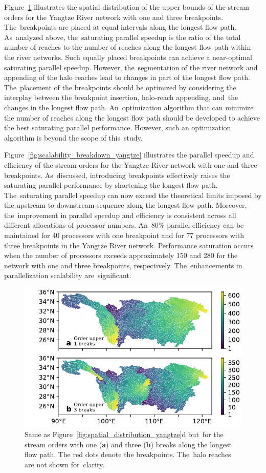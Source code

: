\documentclass[water,article,accept,pdftex,moreauthors]{Definitions/mdpi}
\begin{document}
Figure~\ref{fig:spatial_distribution_breakdown_yangtze} illustrates the spatial distribution of the upper bounds of the stream orders for the Yangtze River network with one and three breakpoints. The~breakpoints are placed at equal intervals along the longest flow path. As~analyzed above, the~saturating parallel speedup is the ratio of the total number of reaches to the number of reaches along the longest flow path within the river networks. Such equally placed breakpoints can achieve a near-optimal saturating parallel speedup. However, the~segmentation of the river network and appending of the halo reaches lead to changes in part of the longest flow path. The~placement of the breakpoints should be optimized by considering the interplay between the breakpoint insertion, halo-reach appending, and~the changes in the longest flow path. An~optimization algorithm that can minimize the number of reaches along the longest flow path should be developed to achieve the best saturating parallel performance. However, such an optimization algorithm is beyond the scope of this~study.

Figure~\ref{fig:scalability_breakdown_yangtze} illustrates the parallel speedup and efficiency of the stream orders for the Yangtze River network with one and three breakpoints. As~discussed, introducing breakpoints effectively raises the saturating parallel performance by shortening the longest flow path. The~saturating parallel speedup can now exceed the theoretical limits imposed by the upstream-to-downstream sequence along the longest flow path. Moreover, the~improvement in parallel speedup and efficiency is consistent across all different allocations of processor numbers. An~80\% parallel efficiency can be maintained for 40 processors with one breakpoint and for 77 processors with three breakpoints in the Yangtze River network. Performance saturation occurs when the number of processors exceeds approximately 150 and 280 for the network with one and three breakpoints, respectively. The~enhancements in parallelization scalability are~significant.

\begin{figure}[H]
    \includegraphics[width=10.5 cm]{fig/spatial_distribution_breakdown_yangtze.pdf}
    \caption{Same as Figure~\ref{fig:spatial_distribution_yangtze}d but~for the stream orders with one (\textbf{a}) and three (\textbf{b}) breaks along the longest flow path. The red dots denote the breakpoints. The~halo reaches are not shown for~clarity. \label{fig:spatial_distribution_breakdown_yangtze}}
\end{figure}
\unskip
\end{document}
